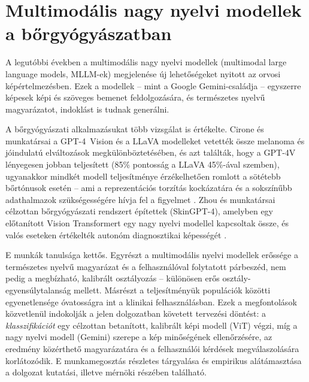 \section{Multimodális nagy nyelvi modellek a bőrgyógyászatban}

A legutóbbi években a multimodális nagy nyelvi modellek (multimodal large
language models, MLLM-ek) megjelenése új lehetőségeket nyitott az orvosi
képértelmezésben. Ezek a modellek -- mint a Google Gemini-családja
\cite{gemini2023} -- egyszerre képesek képi és szöveges bemenet feldolgozására,
és természetes nyelvű magyarázatot, indoklást is tudnak generálni.

A bőrgyógyászati alkalmazásukat több vizsgálat is értékelte. Cirone és
munkatársai a GPT-4~Vision és a LLaVA modelleket vetették össze melanoma és
jóindulatú elváltozások megkülönböztetésében, és azt találták, hogy a GPT-4V
lényegesen jobban teljesített (85\% pontosság a LLaVA 45\%-ával szemben),
ugyanakkor mindkét modell teljesítménye érzékelhetően romlott a sötétebb
bőrtónusok esetén -- ami a reprezentációs torzítás kockázatára és a sokszínűbb
adathalmazok szükségességére hívja fel a figyelmet \cite{cirone2024llm}. Zhou és
munkatársai célzottan bőrgyógyászati rendszert építettek (SkinGPT-4), amelyben
egy előtanított Vision Transformert egy nagy nyelvi modellel kapcsoltak össze,
és valós eseteken értékelték autonóm diagnosztikai képességét
\cite{zhou2024skingpt4}.

E munkák tanulsága kettős. Egyrészt a multimodális nyelvi modellek erőssége a
természetes nyelvű magyarázat és a felhasználóval folytatott párbeszéd, nem pedig
a megbízható, kalibrált osztályozás -- különösen erős
osztály-egyensúlytalanság mellett. Másrészt a teljesítményük populációk közötti
egyenetlensége óvatosságra int a klinikai felhasználásban. Ezek a megfontolások
közvetlenül indokolják a jelen dolgozatban követett tervezési döntést: a
\textit{klasszifikációt} egy célzottan betanított, kalibrált képi modell (ViT)
végzi, míg a nagy nyelvi modell (Gemini) szerepe a kép minőségének ellenőrzésére,
az eredmény közérthető magyarázatára és a felhasználói kérdések megválaszolására
korlátozódik. E munkamegosztás részletes tárgyalása és empirikus alátámasztása a
dolgozat kutatási, illetve mérnöki részében található.


